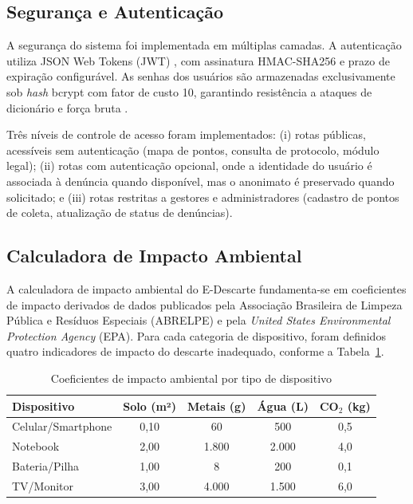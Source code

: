 \documentclass[12pt, a4paper]{article}
\numberwithin{equation}{section}
\numberwithin{figure}{section}
\numberwithin{table}{section}
\begin{document}
\subsection{Segurança e Autenticação}

A segurança do sistema foi implementada em múltiplas camadas. A autenticação
utiliza JSON Web Tokens (JWT) \cite{jones2015}, com assinatura HMAC-SHA256 e
prazo de expiração configurável. As senhas dos usuários são armazenadas
exclusivamente sob \textit{hash} bcrypt com fator de custo 10, garantindo
resistência a ataques de dicionário e força bruta \cite{provos1999}.

Três níveis de controle de acesso foram implementados: (i) rotas públicas,
acessíveis sem autenticação (mapa de pontos, consulta de protocolo, módulo
legal); (ii) rotas com autenticação opcional, onde a identidade do usuário é
associada à denúncia quando disponível, mas o anonimato é preservado quando
solicitado; e (iii) rotas restritas a gestores e administradores (cadastro de
pontos de coleta, atualização de status de denúncias).

\subsection{Calculadora de Impacto Ambiental}

A calculadora de impacto ambiental do E-Descarte fundamenta-se em coeficientes
de impacto derivados de dados publicados pela Associação Brasileira de Limpeza
Pública e Resíduos Especiais (ABRELPE) e pela \textit{United States Environmental
Protection Agency} (EPA). Para cada categoria de dispositivo, foram definidos
quatro indicadores de impacto do descarte inadequado, conforme a
Tabela~\ref{tab:coeficientes}.

\begin{table}[H]
  \centering
  \caption{Coeficientes de impacto ambiental por tipo de dispositivo}
  \label{tab:coeficientes}
  \begin{tabular}{|l|c|c|c|c|}
    \hline
    \textbf{Dispositivo} &
    \textbf{Solo (m²)} &
    \textbf{Metais (g)} &
    \textbf{Água (L)} &
    \textbf{CO$_2$ (kg)} \\
    \hline
    Celular/Smartphone  & 0,10 & 60      & 500   & 0,5 \\
    Notebook            & 2,00 & 1.800   & 2.000 & 4,0 \\
    Bateria/Pilha       & 1,00 & 8       & 200   & 0,1 \\
    TV/Monitor          & 3,00 & 4.000   & 1.500 & 6,0 \\
    \hline
  \end{tabular}
\end{table}
\end{document}
